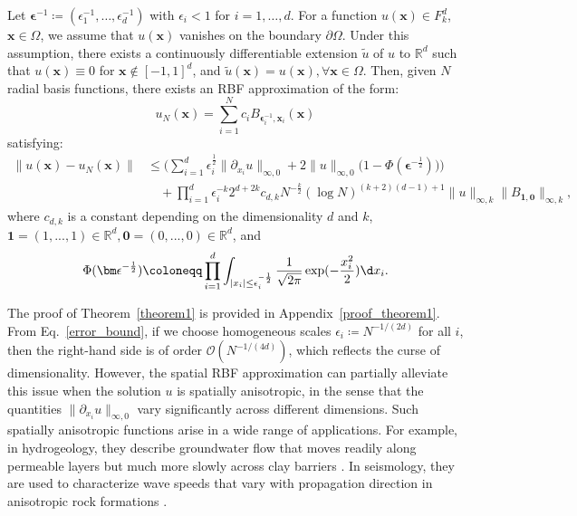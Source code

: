 \begin{theorem}
\label{theorem1}
\rm
Let $\bm{\epsilon}^{-1} \coloneqq (\epsilon_1^{-1}, \ldots, \epsilon_d^{-1})$ with $\epsilon_i < 1$ for $i = 1, \ldots, d$. 
For a function $u(\bm{x}) \in F_k^d$, $\bm{x} \in \Omega$, we assume that $u(\bm{x})$ vanishes on the boundary $\partial \Omega$. 
Under this assumption, there exists a continuously differentiable extension $\tilde{u}$ of $u$ to $\mathbb{R}^d$ such that
$u(\bm{x}) \equiv 0$ for $\bm{x} \notin [-1,1]^d$, and
$\tilde{u}(\bm{x}) = u(\bm{x}), \forall\bm{x} \in \Omega$.
Then, given $N$ radial basis functions, there exists an RBF approximation of the form:
\begin{equation}
    u_N(\bm{x})=\sum_{i=1}^N c_iB_{\bm{\epsilon}_i^{-1}, \bm{x}_i}(\bm{x})
\end{equation}
satisfying:
\begin{equation}
\begin{aligned}
    \|u(\bm{x})-u_N(\bm{x})\|&\leq \bigg(\sum_{i=1}^d\epsilon_i^{\frac{1}{2}}\|\partial_{x_i}u\|_{\infty, 0} + 2\|u\|_{\infty, 0}\big(1-\Phi(\bm\epsilon^{-\frac{1}{2}})\big)\bigg) \\
    &\quad+ \prod_{i=1}^d\epsilon_i^{-k}2^{d+2k}c_{d, k}N^{-\frac{k}{2}}(\log N)^{(k+2)(d-1)+1}\|u\|_{\infty, k}\|B_{\bm{1}, \bm{0}}\|_{\infty, k},
    \end{aligned}
    \label{error_bound}
\end{equation}
where $c_{d, k}$ is a constant depending on the dimensionality $d$ and $k$, $\bm{1}=(1,...,1)\in\mathbb{R}^d, \bm{0}=(0,...,0)\in\mathbb{R}^d$, and 
\begin{equation}
    \Phi(\bm\epsilon^{-\frac{1}{2}})\coloneqq \prod_{i=1}^d\int_{|{x}_i|\leq\epsilon_i^{-\frac{1}{2}}}\frac{1}{\sqrt{2\pi}}\exp(-\frac{x_i^2}{2})\d x_i.
\end{equation}
\end{theorem}



The proof of Theorem~\ref{theorem1} is provided in Appendix~\ref{proof_theorem1}. From Eq.~\eqref{error_bound}, if we choose homogeneous scales $\epsilon_i \coloneqq N^{-1/(2d)}$ for all $i$, then the right-hand side is of order $\mathcal{O}\!\left(N^{-1/(4d)}\right)$, which reflects the curse of dimensionality. However, the spatial RBF approximation can partially alleviate this issue when the solution $u$ is spatially anisotropic, in the sense that the quantities $\|\partial_{x_i} u\|_{\infty,0}$ vary significantly across different dimensions. 
Such spatially anisotropic functions arise in a wide range of applications. For example, in hydrogeology, they describe groundwater flow that moves readily along permeable layers but much more slowly across clay barriers \cite{gelhar1986stochastic,rubin2003applied}. In seismology, they are used to characterize wave speeds that vary with propagation direction in anisotropic rock formations \cite{thomsen1986weak}.


